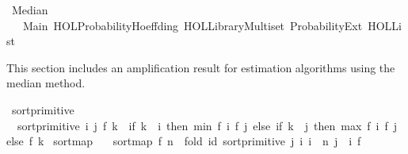 %
\begin{isabellebody}%
%
%
\isadelimdocument
%
\endisadelimdocument
%
\isatagdocument
%
\isamarkuptrue%
%
\endisatagdocument
{\isafolddocument}%
%
\isadelimdocument
%
\endisadelimdocument
%
\isadelimtheory
%
\endisadelimtheory
%
\isatagtheory
{}\isamarkupfalse%
\ Median\isanewline
\ \ \ Main\ {\isachardoublequoteopen}HOL{\isacharminus}{\kern0pt}Probability{\isachardot}{\kern0pt}Hoeffding{\isachardoublequoteclose}\ {\isachardoublequoteopen}HOL{\isacharminus}{\kern0pt}Library{\isachardot}{\kern0pt}Multiset{\isachardoublequoteclose}\ Probability{\isacharunderscore}{\kern0pt}Ext\ {\isachardoublequoteopen}HOL{\isachardot}{\kern0pt}List{\isachardoublequoteclose}\isanewline
{}%
\endisatagtheory
{\isafoldtheory}%
%
\isadelimtheory
%
\endisadelimtheory
%
\begin{isamarkuptext}%
This section includes an amplification result for estimation algorithms using the median
method.%
\end{isamarkuptext}\isamarkuptrue%
\isamarkupfalse%
\ sort{\isacharunderscore}{\kern0pt}primitive\ \isanewline
\ \ {\isachardoublequoteopen}sort{\isacharunderscore}{\kern0pt}primitive\ i\ j\ f\ k\ {\isacharequal}{\kern0pt}\ {\isacharparenleft}{\kern0pt}if\ k\ {\isacharequal}{\kern0pt}\ i\ then\ min\ {\isacharparenleft}{\kern0pt}f\ i{\isacharparenright}{\kern0pt}\ {\isacharparenleft}{\kern0pt}f\ j{\isacharparenright}{\kern0pt}\ else\ {\isacharparenleft}{\kern0pt}if\ k\ {\isacharequal}{\kern0pt}\ j\ then\ max\ {\isacharparenleft}{\kern0pt}f\ i{\isacharparenright}{\kern0pt}\ {\isacharparenleft}{\kern0pt}f\ j{\isacharparenright}{\kern0pt}\ else\ f\ k{\isacharparenright}{\kern0pt}{\isacharparenright}{\kern0pt}{\isachardoublequoteclose}\isanewline
\isanewline
{}\isamarkupfalse%
\ sort{\isacharunderscore}{\kern0pt}map\ \isanewline
\ \ {\isachardoublequoteopen}sort{\isacharunderscore}{\kern0pt}map\ f\ n\ {\isacharequal}{\kern0pt}\ fold\ id\ {\isacharbrackleft}{\kern0pt}sort{\isacharunderscore}{\kern0pt}primitive\ j\ i{\isachardot}{\kern0pt}\ i\ {\isacharless}{\kern0pt}{\isacharminus}{\kern0pt}\ {\isacharbrackleft}{\kern0pt}{}{\isachardot}{\kern0pt}{\isachardot}{\kern0pt}{\isacharless}{\kern0pt}n{\isacharbrackright}{\kern0pt}{\isacharcomma}{\kern0pt}\ j\ {\isacharless}{\kern0pt}{\isacharminus}{\kern0pt}\ {\isacharbrackleft}{\kern0pt}{}{\isachardot}{\kern0pt}{\isachardot}{\kern0pt}{\isacharless}{\kern0pt}i{\isacharbrackright}{\kern0pt}{\isacharbrackright}{\kern0pt}\ f{\isachardoublequoteclose}\isanewline

\end{isabellebody}
